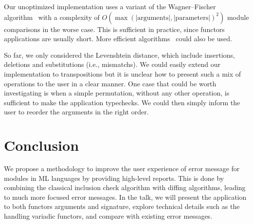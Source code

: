 \documentclass[a4paper,11pt]{scrartcl}
\begin{document}
Our unoptimized implementation uses a variant of the
Wagner–Fischer algorithm~\cite{DBLP:journals/jacm/WagnerF74} with a complexity of
$O(\max(\mathrm{|arguments|,|parameters|})^2)$ module comparisons in the worse case.
This is sufficient in practice, since functors applications are usually short.
More efficient algorithms~\cite{DBLP:journals/siamcomp/LandauMS98} could also be
used.

So far, we only considered the Levenshtein distance, which include
insertions, deletions and substitutions (i.e., mismatchs). We could easily extend
our implementation to transpositions but it is unclear how to present
such a mix of operations to the user in a clear manner.
One case that could be worth investigating is when a simple permutation,
without any other operation,
is sufficient to make the application typechecks. We could then simply
inform the user to reorder the arguments in the right order.



\section{Conclusion}

We propose a methodology to improve the user experience of error message for modules in ML languages by providing high-level reports.
This is done by combining the classical
inclusion check algorithm with diffing algorithms, leading to much more
focused error messages.
In the talk, we will present the application to both functors arguments and
signature, explore technical details such as the handling variadic functors,
and compare with existing error messages.
\end{document}
